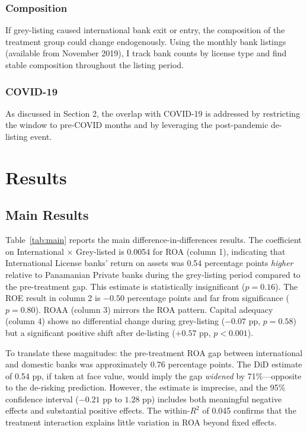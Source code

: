 \documentclass[12pt]{article}
\begin{document}
\subsubsection*{Composition}
If grey-listing caused international bank exit or entry, the composition of the treatment group could change endogenously. Using the monthly bank listings (available from November 2019), I track bank counts by license type and find stable composition throughout the listing period.

\subsubsection*{COVID-19}
As discussed in Section 2, the overlap with COVID-19 is addressed by restricting the window to pre-COVID months and by leveraging the post-pandemic de-listing event.


\section{Results}

\subsection{Main Results}



Table~\ref{tab:main} reports the main difference-in-differences results. The coefficient on International $\times$ Grey-listed is 0.0054 for ROA (column 1), indicating that International License banks' return on assets was 0.54 percentage points \textit{higher} relative to Panamanian Private banks during the grey-listing period compared to the pre-treatment gap. This estimate is statistically insignificant ($p = 0.16$). The ROE result in column 2 is $-0.50$ percentage points and far from significance ($p = 0.80$). ROAA (column 3) mirrors the ROA pattern. Capital adequacy (column 4) shows no differential change during grey-listing ($-0.07$ pp, $p = 0.58$) but a significant positive shift after de-listing ($+0.57$ pp, $p < 0.001$).

To translate these magnitudes: the pre-treatment ROA gap between international and domestic banks was approximately 0.76 percentage points. The DiD estimate of 0.54 pp, if taken at face value, would imply the gap \textit{widened} by 71\%---opposite to the de-risking prediction. However, the estimate is imprecise, and the 95\% confidence interval ($-0.21$ pp to $1.28$ pp) includes both meaningful negative effects and substantial positive effects. The within-$R^2$ of 0.045 confirms that the treatment interaction explains little variation in ROA beyond fixed effects.
\end{document}
